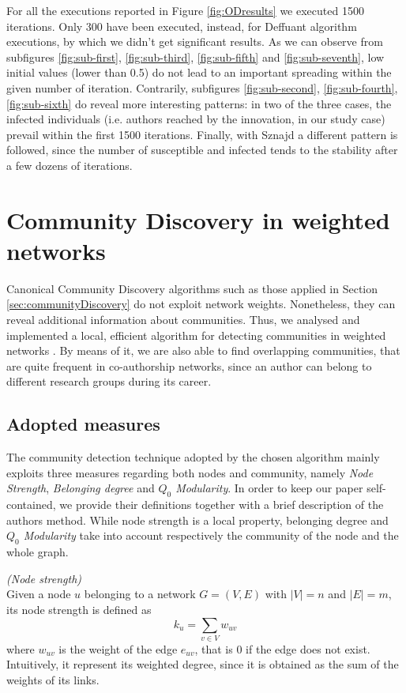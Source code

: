 \documentclass[sigchi]{acmart}
\begin{document}
For all the executions reported in Figure \ref{fig:ODresults} we executed 1500 iterations. Only 300 have been executed, instead, for Deffuant algorithm executions, by which we didn't get significant results. As we can observe from subfigures \ref{fig:sub-first}, \ref{fig:sub-third}, \ref{fig:sub-fifth} and \ref{fig:sub-seventh}, low initial values (lower than 0.5) do not lead to an important spreading within the given number of iteration. Contrarily, subfigures \ref{fig:sub-second}, \ref{fig:sub-fourth}, \ref{fig:sub-sixth} do reveal more interesting patterns: in two of the three cases, the infected individuals (i.e. authors reached by the innovation, in our study case) prevail within the first 1500 iterations. Finally, with Sznajd a different pattern is followed, since the number of susceptible and infected tends to the stability after a few dozens of iterations.

\section{Community Discovery in weighted networks} \label{sec:CDweighted}
Canonical Community Discovery algorithms such as those applied in Section \ref{sec:communityDiscovery} do not exploit network weights. Nonetheless, they can reveal additional information about communities. Thus, we analysed and implemented a local, efficient algorithm for detecting communities in weighted networks \cite{2010PhyA..389.4177C}. By means of it, we are also able to find overlapping communities, that are quite frequent in co-authorship networks, since an author can belong to different research groups during its career.

\subsection{Adopted measures}
The community detection technique adopted by the chosen algorithm \cite{2010PhyA..389.4177C} mainly exploits three measures regarding both nodes and community, namely \textit{Node Strength}, \textit{Belonging degree} and \textit{$Q_0$ Modularity}. In order to keep our paper self-contained, we provide their definitions together with a brief description of the authors method. While node strength is a local property, belonging degree and \textit{$Q_0$ Modularity} take into account respectively the community of the node and the whole graph.

\begin{definition}
\textit{(Node strength)} \\
Given a node $u$ belonging to a network $G=(V, E)$ with $|V| = n$ and $|E| = m$, its node strength is defined as 
$$ k_u = \sum_{v \in V} w_{uv}$$
where $w_{uv}$ is the weight of the edge $e_{uv}$, that is 0 if the edge does not exist. Intuitively, it represent its weighted degree, since it is obtained as the sum of the weights of its links.
\end{definition}
\end{document}
